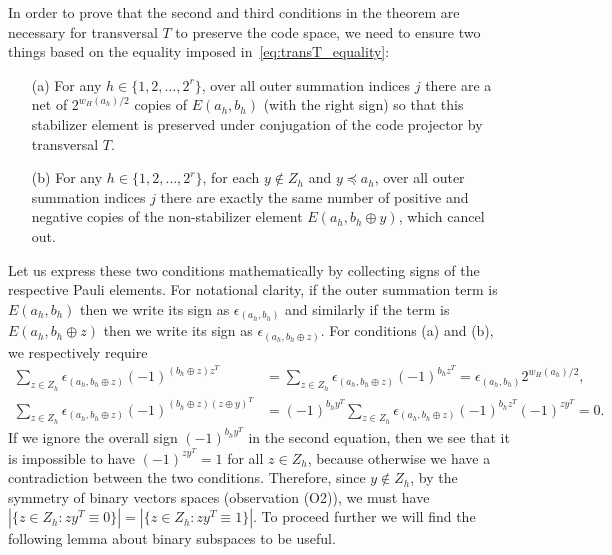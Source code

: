 \documentclass[twoside,romanappendices]{IEEEtran}
\begin{document}
In order to prove that the second and third conditions in the theorem are necessary for transversal $T$ to preserve the code space, we need to ensure two things based on the equality imposed in~\eqref{eq:transT_equality}:
\begin{itemize}
    \item[(a)] For any $h \in \{ 1,2,\ldots,2^r \}$, over all outer summation indices $j$ there are a net of $2^{w_H(a_h)/2}$ copies of $E(a_h, b_h)$ (with the right sign) so that this stabilizer element is preserved under conjugation of the code projector by transversal $T$.
    
    \item[(b)] For any $h \in \{ 1,2,\ldots,2^r \}$, for each $y \notin Z_h$ and $y \preceq a_h$, over all outer summation indices $j$ there are exactly the same number of positive and negative copies of the non-stabilizer element $E(a_h, b_h \oplus y)$, which cancel out.
\end{itemize}
Let us express these two conditions mathematically by collecting signs of the respective Pauli elements.
For notational clarity, if the outer summation term is $E(a_h, b_h)$ then we write its sign as $\epsilon_{(a_h, b_h)}$ and similarly if the term is $E(a_h, b_h \oplus z)$ then we write its sign as $\epsilon_{(a_h, b_h \oplus z)}$.
For conditions (a) and (b), we respectively require
\begin{align}
\sum_{z \in Z_h} \epsilon_{(a_h, b_h \oplus z)} (-1)^{(b_h \oplus z) z^T} & = \sum_{z \in Z_h} \epsilon_{(a_h, b_h \oplus z)} (-1)^{b_h z^T} = \epsilon_{(a_h, b_h)} 2^{w_H(a_h)/2}, \\
%
\sum_{z \in Z_h} \epsilon_{(a_h, b_h \oplus z)} (-1)^{(b_h \oplus z) (z \oplus y)^T} & = (-1)^{b_h y^T} \sum_{z \in Z_h} \epsilon_{(a_h, b_h \oplus z)} (-1)^{b_h z^T} (-1)^{zy^T} = 0.
\end{align}
If we ignore the overall sign $(-1)^{b_h y^T}$ in the second equation, then we see that it is impossible to have $(-1)^{z y^T} = 1$ for all $z \in Z_h$, because otherwise we have a contradiction between the two conditions.
Therefore, since $y \notin Z_h$, by the symmetry of binary vectors spaces (observation (O2)), we must have $|\{ z \in Z_h \colon zy^T \equiv 0 \}| = |\{ z \in Z_h \colon zy^T \equiv 1 \}|$.
To proceed further we will find the following lemma about binary subspaces to be useful.
\end{document}
